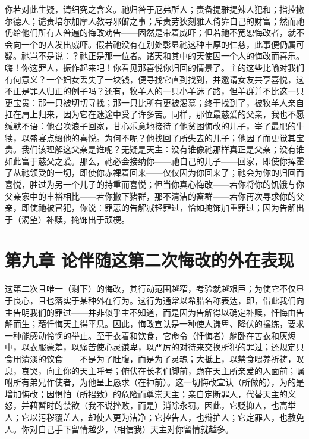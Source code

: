 你若对此生疑，请细究之含义。祂归咎于厄弗所人；责备提雅提辣人犯和；指控撒尔德人；谴责培尔加摩人教导邪僻之事；斥责劳狄刻雅人倚靠自己的财富；然而祂仍给他们所有人普遍的悔改劝告——固然是带着威吓；但若祂不宽恕悔改者，就不会向一个的人发出威吓。假若祂没有在别处彰显祂这种丰厚的仁慈，此事便仍属可疑。祂岂不是说：？祂正是那一位者。诸天和其中的天使因一个人的悔改而喜乐。嗨！你这罪人，振作起来吧！你看见那喜悦你归回的情景了。主的这些比喻对我们有何意义？一个妇女丢失了一块钱，便寻找它直到找到，并邀请女友共享喜悦，这不正是罪人归正的例子吗？还有，牧羊人的一只小羊迷了路，但羊群并不比这一只更宝贵：那一只被切切寻找；那一只比所有更被渴慕；终于找到了，被牧羊人亲自扛在肩上归来，因为它在迷途中受了许多苦。同样，那位最慈爱的父亲，我也不愿缄默不语：他召唤浪子回家，甘心乐意地接待了他贫困悔改的儿子，宰了最肥的牛犊，以盛宴点缀他的喜悦。为何不呢？他找回了所失去的儿子；他因了而更觉其宝贵。我们该理解这父亲是谁呢？无疑是天主：没有谁像祂那样真正是父亲；没有谁如此富于慈父之爱。那么，祂必会接纳你——祂自己的儿子——回家，即使你挥霍了从祂领受的一切，即使你赤裸着回来——仅仅因为你回来了；祂会为你的归回而喜悦，胜过为另一个儿子的持重而喜悦；但当你真心悔改——若你将你的饥饿与你父亲家中的丰裕相比——若你撇下猪群，那不清洁的畜群——若你再次寻求你的父亲，即使祂被冒犯，你说：罪恶的告解减轻罪过，恰如掩饰加重罪过；因为告解出于（渴望）补赎，掩饰出于顽梗。\par


\section{第九章 论伴随这第二次悔改的外在表现}

这第二次且唯一（剩下）的悔改，其行动范围越窄，考验就越艰巨；为使它不仅显于良心，且也落实于某种外在行为。这行为通常以希腊名称表达，即，借此我们向主告明我们的罪过——并非似乎主不知道，而是因为告解得以确定补赎，忏悔由告解而生；藉忏悔天主得平息。因此，悔改宣认是一种使人谦卑、降伏的操练，要求一种能感动怜悯的举止。至于衣着和饮食，它命令（忏悔者）躺卧在苦衣和灰烬中，以衣服蒙羞，以痛苦使心灵谦卑，以严厉的对待来交换所犯的罪过；还规定只食用清淡的饮食——不是为了肚腹，而是为了灵魂；大抵上，以禁食喂养祈祷，叹息，哀哭，向主你的天主呼号；俯伏在长老们脚前，跪在天主所亲爱的人面前；嘱咐所有弟兄作使者，为他呈上恳求（在神前）。这一切悔改宣认（所做的），为的是增加悔改；因惧怕（所招致）的危险而尊崇天主；亲自定断罪人，代替天主的义怒，并藉暂时的禁欲（我不说挫败，而是）消除永罚。因此，它贬抑人，也高举人；它以污秽覆盖人，却使人更为洁净；它控告人，也辩护人；它定罪人，也赦免人。你对自己手下留情越少，（相信我）天主对你留情就越多。\par

